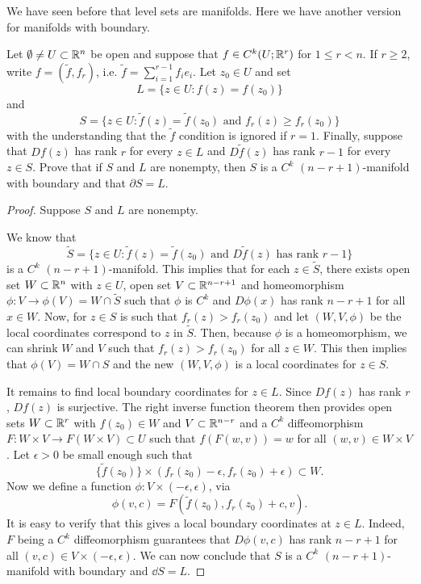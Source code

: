 \documentclass[a4paper]{article}
\begin{document}
We have seen before that level sets are manifolds. Here 
we have another version for manifolds with
boundary.
\begin{thm}
Let $\emptyset \neq U \subset \mathbb{R}^n$ be open and suppose
that $f\in C^k(U;\mathbb{R}^r)$ for $1 \le r < n$.  If $r \ge 2$,
write $f = (\tilde{f},f_r)$, i.e. $\tilde{f} = \sum_{i=1}^
{r-1} f_i e_i$.  Let $z_0 \in U$ and set
\[
L = \{ z \in U : f(z) = f(z_0) \}
\]
and
\[
S = \{ z \in U : \tilde{f}(z) = \tilde{f}(z_0) \text{ and }
f_r(z) \ge f_r(z_0) \}
\]
with the understanding that the $\tilde{f}$ condition is
ignored if $r=1$. Finally, suppose that $Df(z)$ has rank $r$
for every $z \in L$ and $D \tilde{f}(z)$ has rank $r-1$ for
every $z \in S$. Prove that if $S$ and $L$ are nonempty,
then $S$ is a $C^k$ $(n-r+1)$-manifold with boundary and
that $\partial S = L$.
\end{thm}

\begin{proof}
Suppose $S$ and $L$ are nonempty.

We know that 
\[
\tilde{S} = \{z \in U : \tilde{f}(z) = \tilde{f} (z_0) 
\text{ and } D \tilde{f} (z) \text{ has rank $r - 1$}\}
\]
is a $C^k$ $(n - r + 1)$-manifold. This implies that 
for each $z \in \tilde{S}$, there exists 
open set $W \subset \mathbb{R}^n$ with $z \in U$, open set $V \subset 
\mathbb{R}^{n-r+1}$ and homeomorphism $\phi : V \to \phi(V) 
= W \cap \tilde{S}$ such that $\phi$ is $C^k$
and $D \phi(x)$ has rank $n-r+1$ for all $x \in W$. 
Now, for $z \in S$ is such that $f_r(z) > 
f_r(z_0)$ and let $(W, V, \phi)$ be the local coordinates
correspond to $z$ in $\tilde{S}$. Then, because $\phi$ is a 
homeomorphism, we can shrink $W$ and $V$ such that 
$f_r(z) > f_r(z_0)$ for all $z \in W$. This then implies that 
$\phi(V) = W \cap S$ and the new $(W, V, \phi)$ is a 
local coordinates for $z \in S$. 

It remains to find local boundary coordinates for $z \in L$.
Since $Df(z)$ has rank $r$, $Df(z)$ is surjective.
The right inverse function theorem then provides open 
sets $W \subset \mathbb{R}^r$ with $f(z_0) \in W$
and $V \subset \mathbb{R}^{n - r}$ and a 
$C^k$ diffeomorphism $F : W \times V 
\to F(W \times V) \subset U$ such that 
$f(F(w, v)) = w$ for all $(w, v) \in W \times V$.
Let $\epsilon > 0$ be small enough such that 
\[
\{\tilde{f}(z_0)\} \times (f_r(z_0) - \epsilon, 
f_r(z_0) + \epsilon) \subset W.
\]
Now we define a function $\phi : V \times (- \epsilon, 
\epsilon)$, via
\[
\phi(v, c) = F(\tilde{f}(z_0), f_r(z_0) + c, v).
\]
It is easy to verify that this gives a local boundary coordinates
at $z \in L$. Indeed, $F$ being a $C^k$ diffeomorphism
guarantees that $D \phi(v, c)$ has rank 
$n - r + 1$ for all $(v, c) \in V \times (-\epsilon, 
\epsilon)$. We can now conclude that $S$ is a 
$C^k$ $(n - r + 1)$-manifold with boundary
and $\dd S = L$.
\end{proof}
\end{document}
